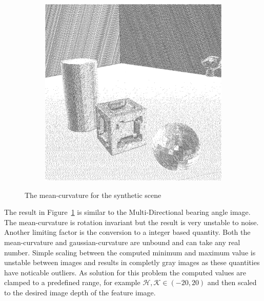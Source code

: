 \begin{figure}[H]
\begin{subfigure}[t]{0.32\textwidth}
    \end{subfigure}
    \begin{subfigure}[t]{0.32\textwidth}
        \includegraphics[width=\linewidth]{chapter04/img/mean-0210.png}
    \end{subfigure}
    \caption[\Gls{mean-curvature} in the synthetic scene]{The \Gls{mean-curvature} for the synthetic scene}\label{fig:mean-curvature}
\end{figure}
The result in Figure~\ref{fig:mean-curvature} is similar to the Multi-Directional bearing angle image.
The \gls{mean-curvature} is rotation invariant but the result is very unstable to noise.
Another limiting factor is the conversion to a integer based quantity.
Both the \gls{mean-curvature} and \gls{gaussian-curvature} are unbound and can take any real number.
Simple scaling between the computed minimum and maximum value is unstable between images and results in completly gray images as these quantities have noticable outliers.
As solution for this problem the computed values are clamped to a predefined range, for example $\mathcal{H},\mathcal{K} \in (-20, 20)$ and then scaled to the desired image depth of the feature image.

